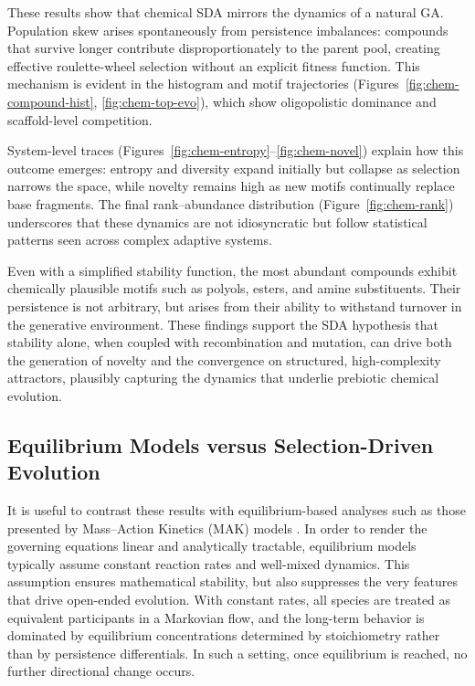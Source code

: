 \documentclass[life,article,submit,pdftex,moreauthors]{Definitions/mdpi}
\begin{document}
These results show that chemical SDA mirrors the dynamics of a natural GA. Population skew arises spontaneously from persistence imbalances: compounds that survive longer contribute disproportionately to the parent pool, creating effective roulette-wheel selection without an explicit fitness function. This mechanism is evident in the histogram and motif trajectories (Figures~\ref{fig:chem-compound-hist}, \ref{fig:chem-top-evo}), which show oligopolistic dominance and scaffold-level competition.  

System-level traces (Figures~\ref{fig:chem-entropy}--\ref{fig:chem-novel}) explain how this outcome emerges: entropy and diversity expand initially but collapse as selection narrows the space, while novelty remains high as new motifs continually replace base fragments. The final rank–abundance distribution (Figure~\ref{fig:chem-rank}) underscores that these dynamics are not idiosyncratic but follow statistical patterns seen across complex adaptive systems.  

Even with a simplified stability function, the most abundant compounds exhibit chemically plausible motifs such as polyols, esters, and amine substituents. Their persistence is not arbitrary, but arises from their ability to withstand turnover in the generative environment. These findings support the SDA hypothesis that stability alone, when coupled with recombination and mutation, can drive both the generation of novelty and the convergence on structured, high-complexity attractors, plausibly capturing the dynamics that underlie prebiotic chemical evolution.  


\subsection{Equilibrium Models versus Selection-Driven Evolution}

It is useful to contrast these results with equilibrium-based analyses such as those presented by Mass–Action Kinetics (MAK) models
\cite{fogler1999chemical,TuranyiTomlin2014}. In order to render the governing equations linear and analytically tractable, equilibrium models typically assume constant reaction rates and well-mixed dynamics. This assumption ensures mathematical stability, but also suppresses the very features that drive open-ended evolution. With constant rates, all species are treated as equivalent participants in a Markovian flow, and the long-term behavior is dominated by equilibrium concentrations determined by stoichiometry rather than by persistence differentials. In such a setting, once equilibrium is reached, no further directional change occurs.
\end{document}
